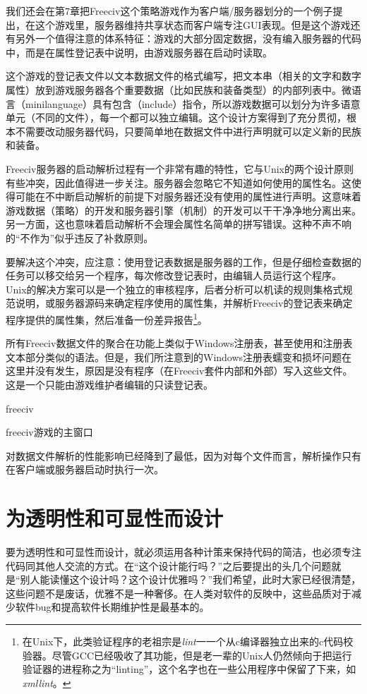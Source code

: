 \documentclass[12pt,oneside]{ctexbook}
\begin{document}
\begin{common-format}
我们还会在第7章把Freeciv这个策略游戏作为客户端/服务器划分的一个例子提出，在这个游戏里，服务器维持共享状态而客户端专注GUI表现。但是这个游戏还有另外一个值得注意的体系特征：游戏的大部分固定数据，没有编入服务器的代码中，而是在属性登记表中说明，由游戏服务器在启动时读取。

这个游戏的登记表文件以文本数据文件的格式编写，把文本串（相关的文字和数字属性）放到游戏服务器各个重要数据（比如民族和装备类型）的内部列表中。微语言（minilanguage）具有包含（include）指令，所以游戏数据可以划分为许多语意单元（不同的文件），每一个都可以独立编辑。这个设计方案得到了充分贯彻，根本不需要改动服务器代码，只要简单地在数据文件中进行声明就可以定义新的民族和装备。

Freeciv服务器的启动解析过程有一个非常有趣的特性，它与Unix的两个设计原则有些冲突，因此值得进一步关注。服务器会忽略它不知道如何使用的属性名。这使得可能在不中断启动解析的前提下对服务器还没有使用的属性进行声明。这意味着游戏数据（策略）的开发和服务器引擎（机制）的开发可以干干净净地分离出来。另一方面，这也意味着启动解析不会理会属性名简单的拼写错误。这种不声不响的“不作为”似乎违反了补救原则。

要解决这个冲突，应注意：使用登记表数据是服务器的工作，但是仔细检查数据的任务可以移交给另一个程序，每次修改登记表时，由编辑人员运行这个程序。Unix的解决方案可以是一个独立的审核程序，后者分析可以机读的规则集格式规范说明，或服务器源码来确定程序使用的属性集，并解析Freeciv的登记表来确定程序提供的属性集，然后准备一份差异报告\footnote{在Unix下，此类验证程序的老祖宗是\textit{lint}一一个从c编译器独立出来的c代码校验器。尽管GCC已经吸收了其功能，但是老一辈的Unix人仍然倾向于把运行验证器的进程称之为“linting”，这个名字也在一些公用程序中保留了下来，如\textit{xmllint}。}。

所有Freeciv数据文件的聚合在功能上类似于Windows注册表，甚至使用和注册表文本部分类似的语法。但是，我们所注意到的Windows注册表蠕变和损坏问题在这里并没有发生，原因是没有程序（在Freeciv套件内部和外部）写入这些文件。这是一个只能由游戏维护者编辑的只读登记表。

\begin{linefig}{freeciv}
\caption{freeciv游戏的主窗口}
\label{fig:freeciv}
\end{linefig}

对数据文件解析的性能影响已经降到了最低，因为对每个文件而言，解析操作只有在客户端或服务器启动时执行一次。



\section{为透明性和可显性而设计}
要为透明性和可显性而设计，就必须运用各种计策来保持代码的简洁，也必须专注代码同其他人交流的方式。在“这个设计能行吗？”之后要提出的头几个问题就是“别人能读懂这个设计吗？这个设计优雅吗？”我们希望，此时大家已经很清楚，这些问题不是废话，优雅不是一种奢侈。在人类对软件的反映中，这些品质对于减少软件bug和提高软件长期维护性是最基本的。


\end{common-format}
\end{document}
